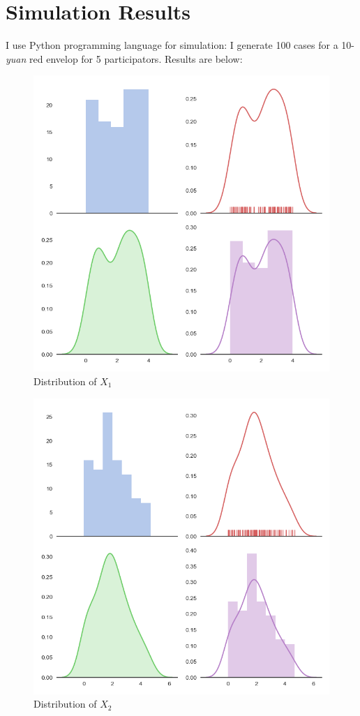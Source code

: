 \documentclass[10pt,journal]{IEEEtran}
\begin{document}
\section{Simulation Results}
I use Python programming language for simulation:
I generate 100 cases for a 10-\emph{yuan} red envelop for 5 participators. Results are below:
\\
\begin{figure}[!ht]
	\centering
	\includegraphics[width=0.7\columnwidth,height=0.6\linewidth]{output_1.png}
	\caption{Distribution of \(X_1\)}
\end{figure}
\begin{figure}[!ht]
	\centering
	\includegraphics[width=0.7\columnwidth,height=0.6\linewidth]{output_2.png}
	\caption{Distribution of \(X_2\)}
\end{figure}
\end{document}
